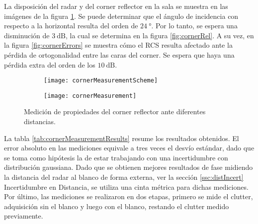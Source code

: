La disposición del radar y del corner reflector en la sala se muestra en las imágenes de la  figura \ref{fig:cornerMeasurement}. Se puede determinar que el ángulo de incidencia con respecto a la horizontal resulta del orden de $\SI{24}{\degree}$. Por lo tanto, se espera una disminución de $\SI{3}{\dB}$, la cual se determina en la figura \ref{fig:cornerRel}. A su vez, en la figura \ref{fig:cornerErrors} se muestra cómo el RCS resulta afectado ante la pérdida de ortogonalidad entre las caras del corner. Se espera que haya una pérdida extra del orden de los $\SI{10}{\dB}$.
\begin{figure}
  \centering
  \begin{subfigure}{0.54\textwidth}
    \texttt{[image: cornerMeasurementScheme]}
  \end{subfigure}
  \begin{subfigure}{0.44\textwidth}
    \texttt{[image: cornerMeasurement]}
  \end{subfigure}
  \caption{Medición de propiedades del corner reflector ante diferentes distancias.}
  \label{fig:cornerMeasurement}
\end{figure}
La tabla \ref{tab:cornerMeasurementResults} resume los resultados obtenidos. El error absoluto en las mediciones equivale a tres veces el desvío estándar, dado que se toma como hipótesis la de estar trabajando con una incertidumbre con distribución gaussiana. Dado que se obtienen mejores resultados de fase midiendo la distancia del radar al blanco de forma externa, ver la sección \ref{ssc:distIncert} Incertidumbre en Distancia, se utiliza una cinta métrica para dichas mediciones. Por último, las mediciones se realizaron en dos etapas, primero se mide el clutter, adquisición sin el blanco y luego con el blanco, restando el clutter medido previamente.

